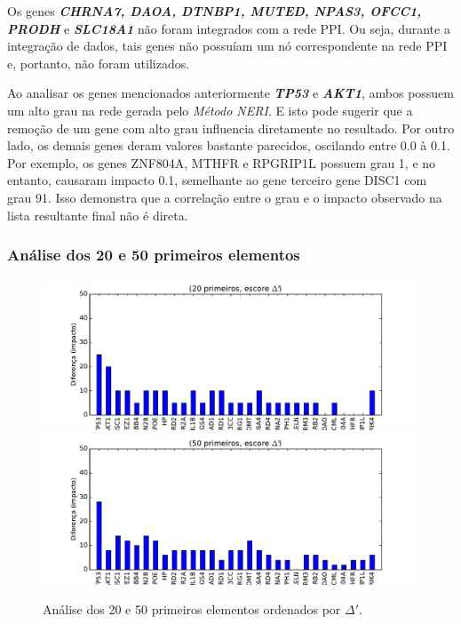 Os genes \textbf{\textit{CHRNA7, DAOA, DTNBP1, MUTED, NPAS3, OFCC1, PRODH}} e \textbf{\textit{SLC18A1}} não foram integrados com a rede PPI.
Ou seja, durante a integração de dados, tais genes não possuíam um nó correspondente na rede PPI e, portanto, não foram utilizados.

Ao analisar os genes mencionados anteriormente \textbf{\textit{TP53}} e \textbf{\textit{AKT1}}, ambos possuem um alto grau na rede gerada pelo \textsl{Método NERI}.
E isto pode sugerir que a remoção de um gene com alto grau influencia diretamente no resultado.
%
Por outro lado, os demais genes deram valores bastante parecidos, oscilando entre 0.0 à 0.1.
Por exemplo, os genes ZNF804A, MTHFR e RPGRIP1L possuem grau 1, e no entanto, causaram impacto 0.1, semelhante ao gene terceiro gene DISC1 com grau 91.
Isso demonstra que a correlação entre o grau e o impacto observado na lista resultante final não é direta. 
%

%
\subsubsection{Análise dos 20 e 50 primeiros elementos}
%
\begin{figure}[ht!]
\includegraphics[width=1\textwidth]{Images/analyses/fig_LOO_S_20.pdf}
\includegraphics[width=1\textwidth]{Images/analyses/fig_LOO_S_50.pdf}
\caption {Análise dos 20 e 50 primeiros elementos ordenados por $\Delta'$.
\label{fig_LOO_S_20-50}}
\end{figure}
%

